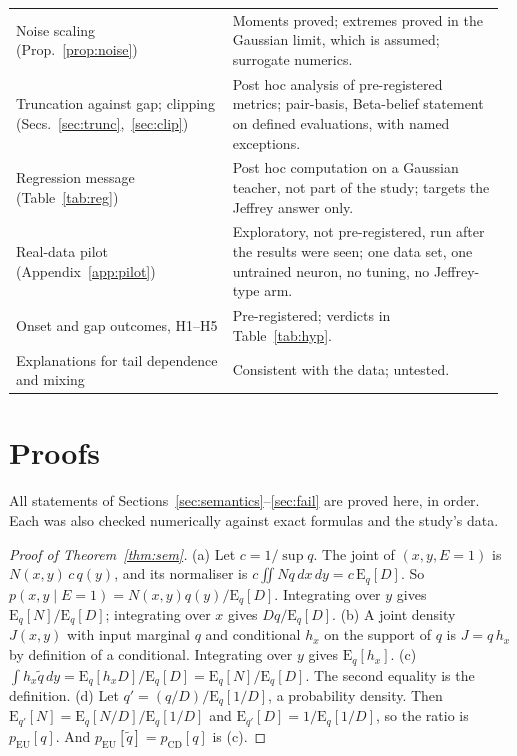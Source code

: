 \documentclass[10pt,a4paper]{article}
\newcommand{\pcd}{p_{\mathrm{CD}}}
\newcommand{\peu}{p_{\mathrm{EU}}}
\newcommand{\Eq}{\mathrm{E}_q}
\theoremstyle{upright}
\begin{document}
\begin{table}[htbp]
\begin{tabular}{@{}>{\raggedright\arraybackslash}p{0.43\linewidth}>{\raggedright\arraybackslash}p{0.54\linewidth}@{}}
Noise scaling (Prop.~\ref{prop:noise}) & Moments proved; extremes proved in the Gaussian limit, which is assumed; surrogate numerics. \\
Truncation against gap; clipping (Secs.~\ref{sec:trunc},~\ref{sec:clip}) & Post hoc analysis of pre-registered metrics; pair-basis, Beta-belief statement on defined evaluations, with named exceptions. \\
Regression message (Table~\ref{tab:reg}) & Post hoc computation on a Gaussian teacher, not part of the study; targets the Jeffrey answer only. \\
Real-data pilot (Appendix~\ref{app:pilot}) & Exploratory, not pre-registered, run after the results were seen; one data set, one untrained neuron, no tuning, no Jeffrey-type arm. \\
Onset and gap outcomes, H1--H5 & Pre-registered; verdicts in Table~\ref{tab:hyp}. \\
Explanations for tail dependence and mixing & Consistent with the data; untested. \\
\bottomrule
\end{tabular}
\end{table}

\section{Proofs}\label{app:proofs}

All statements of Sections~\ref{sec:semantics}--\ref{sec:fail} are proved here, in order. Each was also checked numerically against exact formulas and the study's data.

\begin{proof}[Proof of Theorem~\ref{thm:sem}]
(a) Let $c=1/\sup q$. The joint of $(x,y,E=1)$ is $N(x,y)\,c\,q(y)$, and its normaliser is $c\iint Nq\,dx\,dy=c\,\Eq[D]$. So $p(x,y\mid E=1)=N(x,y)q(y)/\Eq[D]$. Integrating over $y$ gives $\Eq[N]/\Eq[D]$; integrating over $x$ gives $Dq/\Eq[D]$.
(b) A joint density $J(x,y)$ with input marginal $q$ and conditional $h_x$ on the support of $q$ is $J=q\,h_x$ by definition of a conditional. Integrating over $y$ gives $\Eq[h_x]$.
(c) $\int h_x\tilde q\,dy=\Eq[h_xD]/\Eq[D]=\Eq[N]/\Eq[D]$. The second equality is the definition.
(d) Let $q'=(q/D)/\Eq[1/D]$, a probability density. Then $\mathrm{E}_{q'}[N]=\Eq[N/D]/\Eq[1/D]$ and $\mathrm{E}_{q'}[D]=1/\Eq[1/D]$, so the ratio is $\peu[q]$. And $\peu[\tilde q]=\pcd[q]$ is (c).
\end{proof}
\end{document}
